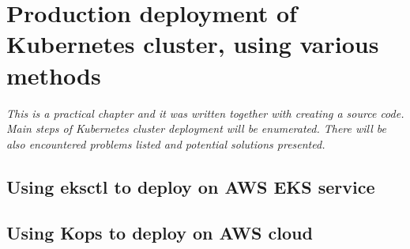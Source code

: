 \section{Production deployment of Kubernetes cluster, using various methods}
\textit{This is a practical chapter and it was written together with creating a source code. Main steps of Kubernetes cluster deployment will be enumerated. There will be also encountered problems listed and potential solutions presented.}

\subsection{Using eksctl to deploy on AWS EKS service}
\subsection{Using Kops to deploy on AWS cloud}
